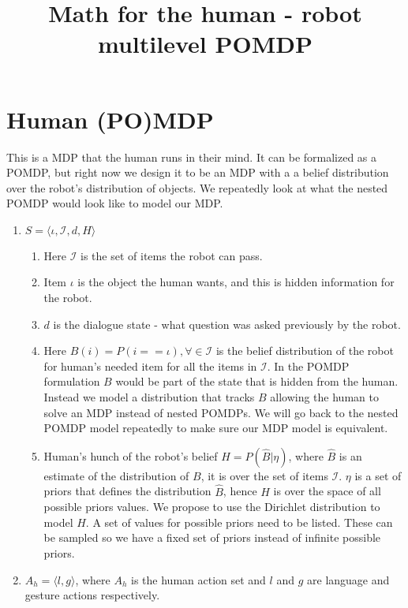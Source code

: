 \documentclass{article}
\title{Math for the human - robot multilevel POMDP}
\date{}
\newcommand{\myitem}{\stepcounter{enumi}\item[$*$\theenumi.]}
\begin{document}
\maketitle
\section{Human (PO)MDP}
This is a MDP that the human runs in their mind. It can be formalized as a POMDP, but right now we design it to be an MDP with a a belief distribution over the robot's distribution of objects. We repeatedly look at what the nested POMDP would look like to model our MDP.




\begin{enumerate}

	\item $S = \langle \iota, \mathcal{I}, d, H \rangle$
	\begin{enumerate}
	\item Here $\mathcal{I}$ is the set of items the robot can pass. 
	\item Item $\iota$ is the object the human wants, and this is hidden information for the robot. 
	\item $d$ is the dialogue state - what question was asked previously by the robot.
	\item Here $B(i) = P(i == \iota), \forall \in \mathcal{I}$ is the belief distribution of the robot for human's needed item for all the items in $\mathcal{I}$. In the POMDP formulation $B$ would be part of the state that is hidden from the human. Instead we model a distribution that tracks $B$ allowing the human to solve an MDP instead of nested POMDPs. We will go back to the nested POMDP model repeatedly to make sure our MDP model is equivalent.
	
	\myitem Human's hunch of the robot's belief $H = P(\widehat{B}| \eta)$, where $\widehat{B}$ is an estimate of the distribution of $B$, it is over the set of items $\mathcal{I}$. $\eta$ is a set of priors that defines the distribution $\widehat{B}$, hence $H$ is over the space of all possible priors values. We propose to use the Dirichlet distribution to model $H$.   A set of values for possible priors need to be listed. These can be sampled so we have a fixed set of priors instead of infinite possible priors.
	
	\end{enumerate}
	

	\item $A_h = \langle l,g \rangle$, where $A_h$ is the human action set and $l$ and $g$ are language and gesture actions respectively.
	

\end{enumerate}
\end{document}
